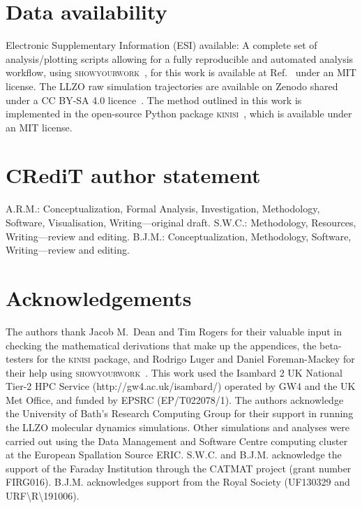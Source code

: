 \documentclass[reprint,superscriptaddress,nobibnotes,amsmath,amssymb,aps,prx,hidelinks]{revtex4-2}
\begin{document}
\section*{Data availability}

Electronic Supplementary Information (ESI) available: A complete set of analysis/plotting scripts allowing for a fully reproducible and automated analysis workflow, using \textsc{showyourwork}~\cite{luger_showyourwork_2021}, for this work is available at Ref.~\cite{mccluskey_github_2022} under an MIT license.
The LLZO raw simulation trajectories are available on Zenodo shared under a CC BY-SA 4.0 licence~\cite{coles_llzo_zenodo_2022}.
The method outlined in this work is implemented in the open-source Python package \textsc{kinisi}~\cite{mccluskey_kinisi_2022}, which is available under an MIT license.

\section*{CR\lowercase{e}d\lowercase{i}T author statement}

A.R.M.: Conceptualization, Formal Analysis, Investigation, Methodology, Software, Visualisation, Writing---original draft.
S.W.C.: Methodology, Resources, Writing---review and editing.
B.J.M.: Conceptualization, Methodology, Software, Writing---review and editing.

\section*{Acknowledgements}

The authors thank Jacob M.\ Dean and Tim Rogers for their valuable input in checking the mathematical derivations that make up the appendices, the beta-testers for the \textsc{kinisi} package, and Rodrigo Luger and Daniel Foreman-Mackey for their help using \textsc{showyourwork}~\cite{luger_showyourwork_2021}.
This work used the Isambard 2 UK National Tier-2 HPC Service (http://gw4.ac.uk/isambard/) operated by GW4 and the UK Met Office, and funded by EPSRC (EP/T022078/1).
The authors acknowledge the University of Bath's Research Computing Group for their support in running the LLZO molecular dynamics simulations.
Other simulations and analyses were carried out using the Data Management and Software Centre computing cluster at the European Spallation Source ERIC.
S.W.C. and B.J.M. acknowledge the support of the Faraday Institution through the CATMAT project (grant number FIRG016). 
B.J.M. acknowledges support from the Royal Society (UF130329 and URF\textbackslash R\textbackslash 191006). 



\end{document}
